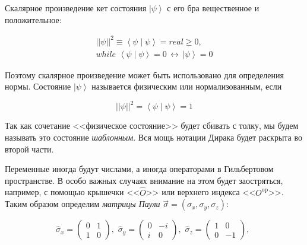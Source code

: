 \documentclass[main.tex]{subfiles}
\begin{document}
Скалярное произведение кет состояния $\left|\psi\right>$ с его бра вещественное и положительное:

\begin{align}\label{1.2}
	||\psi||^2 \equiv \left<\psi\mid\psi\right> = real\ge 0,\\
	while \,\, \left<\psi\mid\psi\right> = 0 \,\leftrightarrow \, \left|\psi\right> = 0 
\end{align}

Поэтому скалярное произведение может быть использовано для определения нормы. Состояние $\left|\psi\right>$ называется физическим или нормализованным, если

\begin{equation}\label{norma}
	||\psi||^2 = \left<\psi\mid\psi\right> = 1
\end{equation}

Так как сочетание <<физическое состояние>> будет сбивать с толку, мы будем называть это состояние \textit{шаблонным}. Вся мощь нотации Дирака будет раскрыта во второй части.

Переменные иногда будут числами, а иногда операторами в Гильбертовом пространстве. В особо важных случаях внимание на этом будет заостряться, например, с помощью крышечки <<$\hat O$>> или верхнего индекса <<$O^\mathrm{op}$>>. Таким образом определим \textit{матрицы Паули} $\vec\sigma = (\sigma_x, \sigma_y, \sigma_z)$:

\begin{equation}\label{norma}
	\hat \sigma_x = \begin{pmatrix}
 0&1 \\ 
 1&0 
\end{pmatrix}, \,\,
\hat \sigma_y = \begin{pmatrix}
 0&-i \\ 
 i&0 
\end{pmatrix}, \,\,
\hat \sigma_z = \begin{pmatrix}
1 &0 \\ 
 0& -1
\end{pmatrix}, \,\,
\end{equation}
\end{document}
